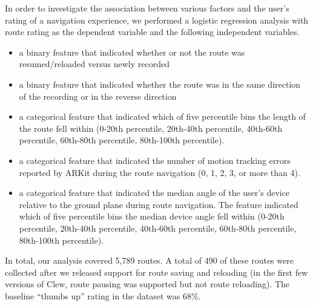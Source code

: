 \documentclass[chi]{sigchi}
\begin{document}
In order to investigate the association between various factors and the user's rating of a navigation experience, we performed a logistic regression analysis with route rating as the dependent variable and the following independent variables.
\begin{itemize}
\item a binary feature that indicated whether or not the route was resumed/reloaded versus newly recorded
\item a binary feature that indicated whether the route was in the same direction of the recording or in the reverse direction
\item a categorical feature that indicated which of five percentile bins the length of the route fell within (0-20th percentile, 20th-40th percentile, 40th-60th percentile, 60th-80th percentile, 80th-100th percentile).
\item a categorical feature that indicated the number of motion tracking errors reported by ARKit during the route navigation (0, 1, 2, 3, or more than 4).
\item a categorical feature that indicated the median angle of the user's device relative to the ground plane during route navigation.  The feature indicated which of five percentile bins the median device angle fell within (0-20th percentile, 20th-40th percentile, 40th-60th percentile, 60th-80th percentile, 80th-100th percentile).
\end{itemize}

In total, our analysis covered 5,789 routes.  A total of 490 of these routes were collected after we released support for route saving and reloading (in the first few versions of Clew, route pausing was supported but not route reloading).  The baseline ``thumbs up'' rating in the dataset was 68\%. 
\end{document}
